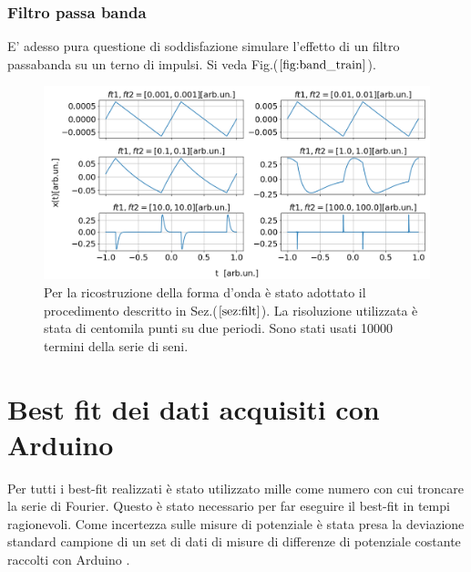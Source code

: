 \documentclass{article}
\begin{document}
            \subsubsection{Filtro passa banda}
                E' adesso pura questione di soddisfazione simulare l'effetto
                di un filtro passabanda su un terno di impulsi. Si veda Fig.($\ref{fig:band_train}$).
                \begin{figure}[H]
                    \centering
                    \includegraphics[width=1\textwidth]{band_train.png} %
                    \caption{Per la ricostruzione della forma d'onda è stato adottato 
                    il procedimento descritto in Sez.($\ref{sez:filt}$).
                    La risoluzione utilizzata è stata di centomila punti su due periodi.
                    Sono stati usati 10000 termini della serie di seni.}
                    \label{fig:band_train}
                \end{figure}


\section{Best fit dei dati acquisiti con Arduino}
    Per tutti i best-fit realizzati è stato utilizzato mille come numero con cui 
    troncare la serie di Fourier. Questo è stato necessario per far eseguire il 
    best-fit in tempi ragionevoli.
    Come incertezza sulle misure di potenziale è stata
    presa la deviazione standard campione di un set di dati di misure
    di differenze di potenziale costante raccolti con Arduino \cite{Antonacci_Sermi2024}.
    
\end{document}
